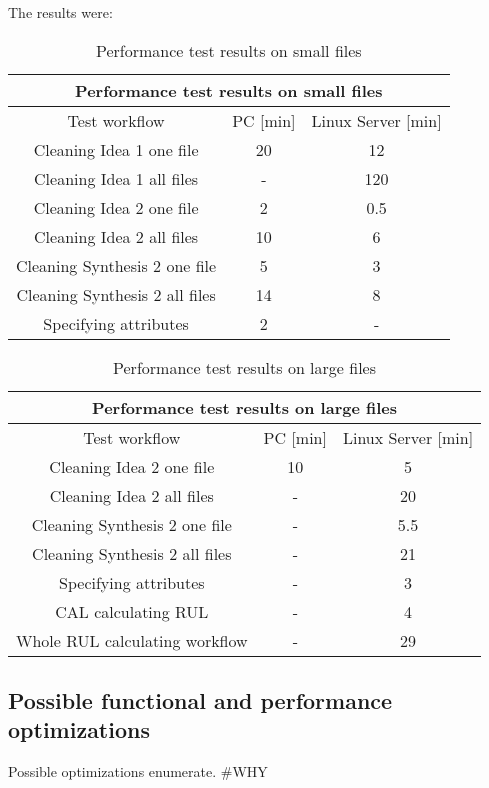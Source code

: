 The results were:
\begin{table}[H]
\centering
\begin{tabular}{ |c|c|c|  }
\hline
\multicolumn{3}{|c|}{Performance test results on small files} \\
\hline
Test workflow& PC [min] & Linux Server [min]\\
\hline
Cleaning Idea 1 one file& 20 & 12 \\
Cleaning Idea 1 all files& - & 120 \\
Cleaning Idea 2 one file& 2 & 0.5 \\
Cleaning Idea 2 all files& 10 & 6 \\
Cleaning Synthesis 2 one file& 5 & 3 \\
Cleaning Synthesis 2 all files& 14 & 8 \\
Specifying attributes & 2 & - \\
\hline
\end{tabular}
\caption{Performance test results on small files}
\label{table:1}
\end{table}

\begin{table}[H]
\centering
\begin{tabular}{ |c|c|c|  }
\hline
\multicolumn{3}{|c|}{Performance test results on large files} \\
\hline
Test workflow& PC [min] & Linux Server [min]\\
\hline
Cleaning Idea 2 one file& 10 & 5 \\
Cleaning Idea 2 all files& - & 20 \\
Cleaning Synthesis 2 one file& - & 5.5 \\
Cleaning Synthesis 2 all files& - & 21 \\
Specifying attributes & - & 3 \\
CAL calculating RUL & - & 4 \\
Whole RUL calculating workflow & - & 29 \\
\hline
\end{tabular}
\caption{Performance test results on large files}
\label{table:2}
\end{table}
\subsection{Possible functional and performance optimizations}
Possible optimizations enumerate.
\#WHY
